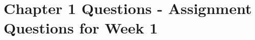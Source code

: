 \documentclass[11pt]{article}
\begin{document}
\section*{Chapter 1 Questions - Assignment Questions for Week 1}


\end{document}

